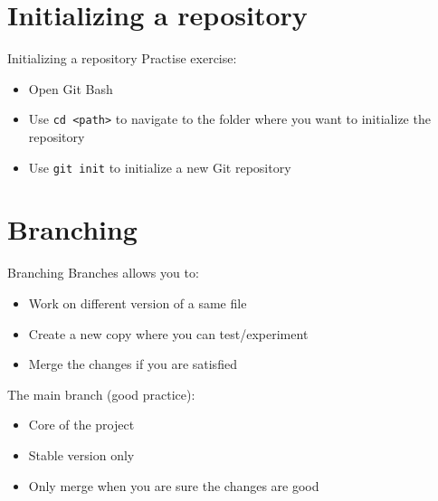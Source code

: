 \documentclass[show notes on second screen=right]{beamer}
\begin{document}
\section{Initializing a repository}
\begin{frame}[t]{Initializing a repository}
  Practise exercise:
  \begin{itemize}
    \item Open Git Bash
    \item Use \texttt{cd <path>} to navigate to the folder where you want to initialize the repository
    \item Use \texttt{git init} to initialize a new Git repository
  \end{itemize}
\end{frame}

\section{Branching}
\begin{frame}[t]{Branching}
  Branches allows you to:
  \begin{itemize}[<+->]
    \item Work on different version of a same file
    \item Create a new copy where you can test/experiment
    \item Merge the changes if you are satisfied
  \end{itemize}
  \onslide<+->
  The main branch (good practice):
  \begin{itemize}
    \item Core of the project
    \item Stable version only
    \item Only merge when you are sure the changes are good
  \end{itemize}
\end{frame}
\end{document}

